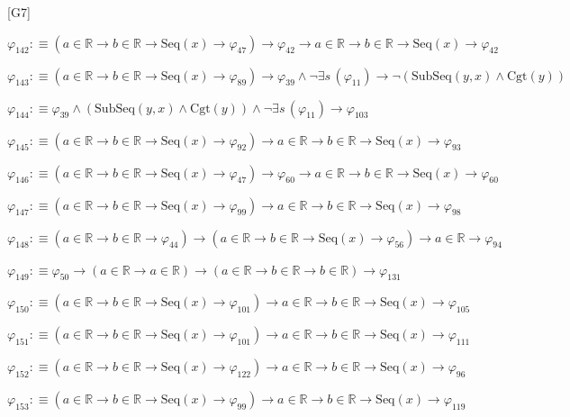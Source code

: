 \begin{fullproof}{[G7]}
\begin{abbrevlist}
\item $\varphi_{142} :\equiv (a \in \mathbb{R} \to b \in \mathbb{R} \to \mathrm{Seq}(x) \to \varphi_{47}) \to \varphi_{42} \to a \in \mathbb{R} \to b \in \mathbb{R} \to \mathrm{Seq}(x) \to \varphi_{42}$
\item $\varphi_{143} :\equiv (a \in \mathbb{R} \to b \in \mathbb{R} \to \mathrm{Seq}(x) \to \varphi_{89}) \to \varphi_{39} \land \neg \exists s\,(\varphi_{11}) \to \neg (\mathrm{SubSeq}(y,x) \land \mathrm{Cgt}(y))$
\item $\varphi_{144} :\equiv \varphi_{39} \land (\mathrm{SubSeq}(y,x) \land \mathrm{Cgt}(y)) \land \neg \exists s\,(\varphi_{11}) \to \varphi_{103}$
\item $\varphi_{145} :\equiv (a \in \mathbb{R} \to b \in \mathbb{R} \to \mathrm{Seq}(x) \to \varphi_{92}) \to a \in \mathbb{R} \to b \in \mathbb{R} \to \mathrm{Seq}(x) \to \varphi_{93}$
\item $\varphi_{146} :\equiv (a \in \mathbb{R} \to b \in \mathbb{R} \to \mathrm{Seq}(x) \to \varphi_{47}) \to \varphi_{60} \to a \in \mathbb{R} \to b \in \mathbb{R} \to \mathrm{Seq}(x) \to \varphi_{60}$
\item $\varphi_{147} :\equiv (a \in \mathbb{R} \to b \in \mathbb{R} \to \mathrm{Seq}(x) \to \varphi_{99}) \to a \in \mathbb{R} \to b \in \mathbb{R} \to \mathrm{Seq}(x) \to \varphi_{98}$
\item $\varphi_{148} :\equiv (a \in \mathbb{R} \to b \in \mathbb{R} \to \varphi_{44}) \to (a \in \mathbb{R} \to b \in \mathbb{R} \to \mathrm{Seq}(x) \to \varphi_{56}) \to a \in \mathbb{R} \to \varphi_{94}$
\item $\varphi_{149} :\equiv \varphi_{50} \to (a \in \mathbb{R} \to a \in \mathbb{R}) \to (a \in \mathbb{R} \to b \in \mathbb{R} \to b \in \mathbb{R}) \to \varphi_{131}$
\item $\varphi_{150} :\equiv (a \in \mathbb{R} \to b \in \mathbb{R} \to \mathrm{Seq}(x) \to \varphi_{101}) \to a \in \mathbb{R} \to b \in \mathbb{R} \to \mathrm{Seq}(x) \to \varphi_{105}$
\item $\varphi_{151} :\equiv (a \in \mathbb{R} \to b \in \mathbb{R} \to \mathrm{Seq}(x) \to \varphi_{101}) \to a \in \mathbb{R} \to b \in \mathbb{R} \to \mathrm{Seq}(x) \to \varphi_{111}$
\item $\varphi_{152} :\equiv (a \in \mathbb{R} \to b \in \mathbb{R} \to \mathrm{Seq}(x) \to \varphi_{122}) \to a \in \mathbb{R} \to b \in \mathbb{R} \to \mathrm{Seq}(x) \to \varphi_{96}$
\item $\varphi_{153} :\equiv (a \in \mathbb{R} \to b \in \mathbb{R} \to \mathrm{Seq}(x) \to \varphi_{99}) \to a \in \mathbb{R} \to b \in \mathbb{R} \to \mathrm{Seq}(x) \to \varphi_{119}$

\end{abbrevlist}
\end{fullproof}
